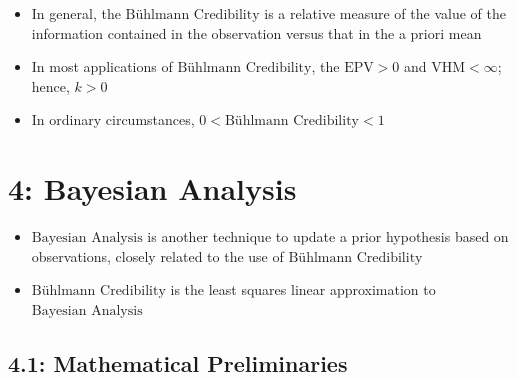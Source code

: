 \documentclass[
]{article}
\begin{document}
\begin{itemize}
\item
  In general, the \(\text{Bühlmann Credibility}\) is a relative measure
  of the value of the information contained in the observation versus
  that in the a priori mean
\item
  In most applications of \(\text{Bühlmann Credibility}\), the
  \(\text{EPV}>0\) and \(\text{VHM}<\infty\); hence, \(k>0\)
\item
  In ordinary circumstances, \(0<\text{Bühlmann Credibility}<1\)
\end{itemize}

\hypertarget{bayesian-analysis}{%
\section{4: Bayesian Analysis}\label{bayesian-analysis}}

\begin{blue}

\begin{itemize}
\item
  \(\text{Bayesian Analysis}\) is another technique to update a prior
  hypothesis based on observations, closely related to the use of
  \(\text{Bühlmann Credibility}\)
\item
  \(\text{Bühlmann Credibility}\) is the least squares linear
  approximation to \(\text{Bayesian Analysis}\)
\end{itemize}

\end{blue}

\hypertarget{mathematical-preliminaries}{%
\subsection{4.1: Mathematical
Preliminaries}\label{mathematical-preliminaries}}
\end{document}
